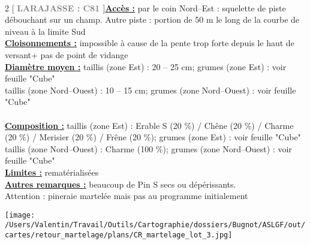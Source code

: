 \documentclass[a4paper,openany]{book}\usepackage[]{graphicx}\usepackage[]{color}
\begin{document}
\\\begin{multicols}{2}
[
\textbf{\textcolor{gray}{
\large LARAJASSE : C81
}}
]\noindent\textbf{\underline{Accès :}} par le coin Nord--Est : squelette de piste débouchant sur un champ. Autre piste : portion de 50 m le long de la courbe de niveau à la limite Sud\vspace{0.1cm} \\\noindent\textbf{\underline{Cloisonnements :}} impossible à cause de la pente trop forte depuis le haut de versant+ pas de point de vidange\vspace{0.1cm} \\\noindent\textbf{\underline{Diamètre moyen :}} taillis (zone Est) : 20 -- 25 cm; grumes (zone Est) : voir feuille "Cube" \\
taillis (zone Nord--Ouest) : 10 -- 15 cm; grumes (zone Nord--Ouest) : voir feuille "Cube" \\\vspace{0.1cm} \\\noindent\textbf{\underline{Composition :}} taillis (zone Est) : Erable S (20 \%) / Chêne (20 \%) / Charme (20 \%) / Merisier (20 \%) / Frêne (20 \%); grumes (zone Est) : voir feuille "Cube"\\
taillis (zone Nord--Ouest) : Charme (100 \%); grumes  (zone Nord--Ouest) : voir feuille "Cube"\vspace{0.1cm} \\\noindent\textbf{\underline{Limites :}} rematérialisées\vspace{0.1cm} \\\noindent\textbf{\underline{Autres remarques :}} beaucoup de Pin S secs ou dépérissants. \\ Attention : pineraie martelée mais pas au programme initialement\vspace{0.1cm} \\\end{multicols}\begin{center}
\texttt{[image: /Users/Valentin/Travail/Outils/Cartographie/dossiers/Bugnot/ASLGF/out/cartes/retour\_martelage/plans/CR\_martelage\_lot\_3.jpg]}
\end{center}\newpage\noindent
\end{document}
